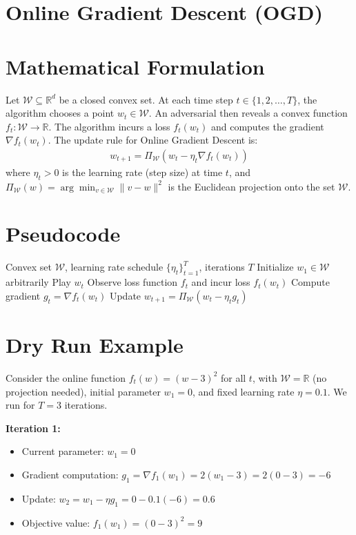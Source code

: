 \documentclass{article}
\begin{document}
\section*{Online Gradient Descent (OGD)}
\section*{Mathematical Formulation}
Let $\mathcal{W} \subseteq \mathbb{R}^d$ be a closed convex set. At each time step $t \in \{1, 2, \dots, T\}$, the algorithm chooses a point $w_t \in \mathcal{W}$. An adversarial then reveals a convex function $f_t : \mathcal{W} \to \mathbb{R}$. The algorithm incurs a loss $f_t(w_t)$ and computes the gradient $\nabla f_t(w_t)$. The update rule for Online Gradient Descent is:
\begin{align*}
w_{t+1} = \Pi_{\mathcal{W}} \left( w_t - \eta_t \nabla f_t(w_t) \right)
\end{align*}
where $\eta_t > 0$ is the learning rate (step size) at time $t$, and $\Pi_{\mathcal{W}}(w) = \arg\min_{v \in \mathcal{W}} \|v - w\|^2$ is the Euclidean projection onto the set $\mathcal{W}$.

\section*{Pseudocode}
\begin{algorithm}[H]
\caption{Online Gradient Descent (OGD)}
\begin{algorithmic}[1]
\REQUIRE Convex set $\mathcal{W}$, learning rate schedule $\{\eta_t\}_{t=1}^T$, iterations $T$
\STATE Initialize $w_1 \in \mathcal{W}$ arbitrarily
\STATE Play $w_t$
\STATE Observe loss function $f_t$ and incur loss $f_t(w_t)$
\STATE Compute gradient $g_t = \nabla f_t(w_t)$
\STATE Update $w_{t+1} = \Pi_{\mathcal{W}} \left( w_t - \eta_t g_t \right)$
\ENDFOR
\end{algorithmic}
\end{algorithm}

\section*{Dry Run Example}
Consider the online function $f_t(w) = (w-3)^2$ for all $t$, with $\mathcal{W} = \mathbb{R}$ (no projection needed), initial parameter $w_1 = 0$, and fixed learning rate $\eta = 0.1$. We run for $T=3$ iterations.

\textbf{Iteration 1:}
\begin{itemize}
\item Current parameter: $w_1 = 0$
\item Gradient computation: $g_1 = \nabla f_1(w_1) = 2(w_1 - 3) = 2(0 - 3) = -6$
\item Update: $w_2 = w_1 - \eta g_1 = 0 - 0.1(-6) = 0.6$
\item Objective value: $f_1(w_1) = (0-3)^2 = 9$
\end{itemize}
\end{document}
